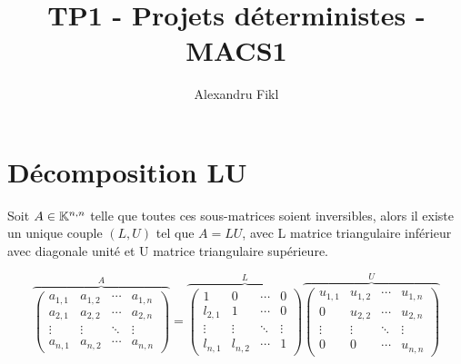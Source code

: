 \documentclass[a4paper,10pt]{article}
\title{TP1 - Projets déterministes - MACS1}
\author{Alexandru Fikl}
\begin{document}
\maketitle

\section{Décomposition LU}
\begin{prop}
    Soit $A \in \mathbb{K}^{n, n}$ telle que toutes ces sous-matrices soient inversibles,
alors il existe un unique couple $(L, U)$ tel que $A = LU$, avec L matrice triangulaire
inférieur avec diagonale unité et U matrice triangulaire supérieure.
\end{prop}
\vspace*{-15pt}
\[
\overbrace{
 \begin{pmatrix}
  a_{1,1} & a_{1,2} & \cdots & a_{1,n} \\
  a_{2,1} & a_{2,2} & \cdots & a_{2,n} \\
  \vdots  & \vdots  & \ddots & \vdots  \\
  a_{n,1} & a_{n,2} & \cdots & a_{n,n}
 \end{pmatrix}}^{\displaystyle A}
 =
 \overbrace{
 \begin{pmatrix}
  1 & 0 & \cdots & 0 \\
  l_{2,1} & 1 & \cdots & 0 \\
  \vdots  & \vdots  & \ddots & \vdots  \\
  l_{n,1} & l_{n,2} & \cdots & 1
 \end{pmatrix}}^{\displaystyle L}
 \overbrace{
 \begin{pmatrix}
  u_{1,1} & u_{1,2} & \cdots & u_{1,n} \\
  0 & u_{2,2} & \cdots & u_{2,n} \\
  \vdots  & \vdots  & \ddots & \vdots  \\
  0 & 0 & \cdots & u_{n,n}
 \end{pmatrix}}^{\displaystyle U}
\]
\end{document}
